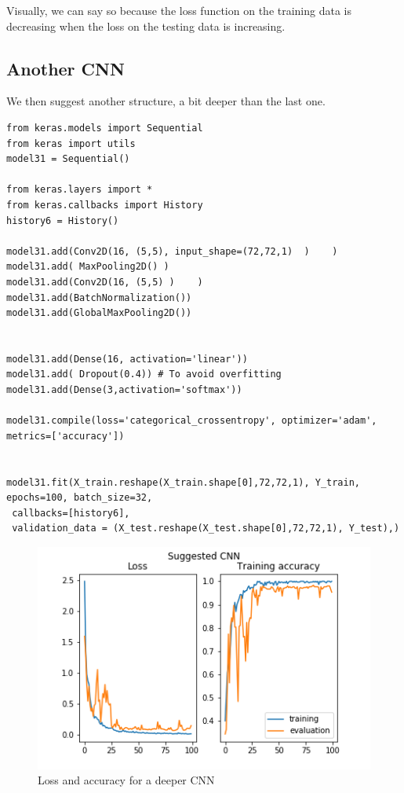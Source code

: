\documentclass[]{article}
\begin{document}
Visually, we can say so because the loss function on the training data is decreasing when the loss on the testing data is increasing.

\subsection{Another CNN}

We then suggest another structure, a bit deeper than the last one.

\begin{verbatim}
from keras.models import Sequential 
from keras import utils
model31 = Sequential()

from keras.layers import *
from keras.callbacks import History 
history6 = History()

model31.add(Conv2D(16, (5,5), input_shape=(72,72,1)  )    )
model31.add( MaxPooling2D() )
model31.add(Conv2D(16, (5,5) )    )
model31.add(BatchNormalization())
model31.add(GlobalMaxPooling2D())


model31.add(Dense(16, activation='linear'))
model31.add( Dropout(0.4)) # To avoid overfitting
model31.add(Dense(3,activation='softmax'))

model31.compile(loss='categorical_crossentropy', optimizer='adam',  metrics=['accuracy'])


model31.fit(X_train.reshape(X_train.shape[0],72,72,1), Y_train, 
epochs=100, batch_size=32, 
 callbacks=[history6], 
 validation_data = (X_test.reshape(X_test.shape[0],72,72,1), Y_test),)
\end{verbatim}

\begin{figure}[h!]
	
	\includegraphics{figures/part3_deeper_cnn}
	\caption{Loss and accuracy for a deeper CNN}
	\label{deepcnn}
\end{figure}
\end{document}
